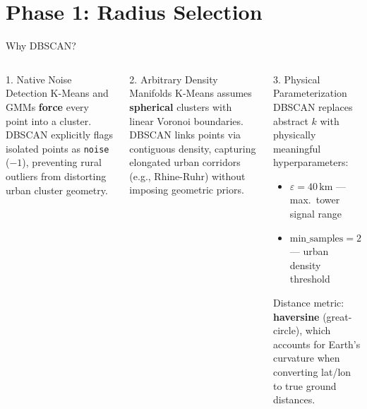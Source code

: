 \section[Radius Selection]{Phase 1: Radius Selection}

\begin{frame}[t]{Why DBSCAN?}{}
    \vspace{-0.3cm}
    \begin{columns}[T]
        \begin{block}{1. Native Noise Detection}
            \vspace{0.1cm}
            {\small K-Means and GMMs \textbf{force} every point into a cluster. DBSCAN explicitly flags isolated points as \texttt{noise} ($-1$), preventing rural outliers from distorting urban cluster geometry.}
            \vspace{0.1cm}
        \end{block}
        \vspace{0.2cm}
        \begin{block}{2. Arbitrary Density Manifolds}
            \vspace{0.1cm}
            {\small K-Means assumes \textbf{spherical} clusters with linear Voronoi boundaries. DBSCAN links points via contiguous density, capturing elongated urban corridors (e.g., Rhine-Ruhr) without imposing geometric priors.}
            \vspace{0.1cm}
        \end{block}

        \begin{block}{3. Physical Parameterization}
            \vspace{0.1cm}
            {\small DBSCAN replaces abstract $k$ with physically meaningful hyperparameters:}
            \begin{itemize}
                \setlength\itemsep{4pt}
                \item {\small $\varepsilon = 40\,\text{km}$ \;---\; max.\ tower signal range}
                \item {\small $\text{min\_samples} = 2$ \;---\; urban density threshold}
            \end{itemize}
            \vspace{0.1cm}
            {\small Distance metric: \textbf{haversine} (great-circle), which accounts for Earth's curvature when converting lat/lon to true ground distances.}
            \vspace{0.1cm}
        \end{block}
    \end{columns}
\end{frame}


